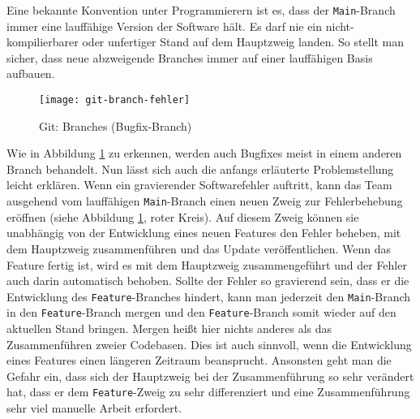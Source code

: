 Eine bekannte Konvention unter Programmierern ist es, dass der
\texttt{Main}-Branch immer eine lauffähige Version der Software hält. Es darf
nie ein nicht-kompilierbarer oder unfertiger Stand auf dem Hauptzweig landen.
So stellt man sicher, dass neue abzweigende Branches immer auf einer
lauffähigen Basis aufbauen.

\begin{figure}[H]
    \centering
    \texttt{[image: git-branch-fehler]}
    \caption{Git: Branches (Bugfix-Branch)}
    \label{fig:git-branch-fehler}
\end{figure}

Wie in Abbildung \ref{fig:git-branch-fehler} zu erkennen, werden auch Bugfixes
meist in einem anderen Branch behandelt. Nun lässt sich auch die anfangs
erläuterte Problemstellung leicht erklären. Wenn ein gravierender Softwarefehler
auftritt, kann das Team ausgehend vom lauffähigen \texttt{Main}-Branch einen
neuen Zweig zur Fehlerbehebung eröffnen (siehe Abbildung
\ref{fig:git-branch-fehler}, roter Kreis). Auf diesem Zweig können sie
unabhängig von der Entwicklung eines neuen Features den Fehler beheben, mit dem
Hauptzweig zusammenführen und das Update veröffentlichen. Wenn das Feature
fertig ist, wird es mit dem Hauptzweig zusammengeführt und der Fehler auch darin automatisch behoben. Sollte der Fehler so gravierend sein, dass er die
Entwicklung des \texttt{Feature}-Branches hindert, kann man jederzeit den
\texttt{Main}-Branch in den \texttt{Feature}-Branch mergen und den
\texttt{Feature}-Branch somit wieder auf den aktuellen Stand bringen. Mergen
heißt hier nichts anderes als das Zusammenführen zweier Codebasen. Dies ist auch
sinnvoll, wenn die Entwicklung eines Features einen längeren Zeitraum
beansprucht. Ansonsten geht man die Gefahr ein, dass sich der Hauptzweig bei der
Zusammenführung so sehr verändert hat, dass er dem \texttt{Feature}-Zweig zu
sehr differenziert und eine Zusammenführung sehr viel manuelle Arbeit erfordert.
